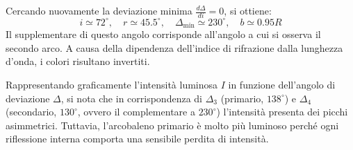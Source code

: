 \documentclass[openany,a4paper,12pt]{book}
\begin{document}
\begin{center}
\end{center}
Cercando nuovamente la deviazione minima $\frac{d\Delta}{di} = 0$, si ottiene:
\[
i \simeq 72^\circ, \quad r \simeq 45.5^\circ, \quad \Delta_{\text{min}} \simeq 230^\circ, \quad b \simeq 0.95 R
\]
Il supplementare di questo angolo corrisponde all'angolo a cui si osserva il secondo arco. A causa della dipendenza dell'indice di rifrazione dalla lunghezza d'onda,
i colori risultano invertiti.


Rappresentando graficamente l'intensità luminosa $I$ in funzione dell'angolo di deviazione $\Delta$, si nota che in corrispondenza di $\Delta_3$ (primario, $138^\circ$) e $\Delta_4$ (secondario, $130^\circ$, ovvero il complementare a $230^\circ$) l'intensità presenta dei picchi asimmetrici. Tuttavia, l'arcobaleno primario è molto più luminoso perché ogni riflessione interna comporta una sensibile perdita di intensità.
\end{document}
